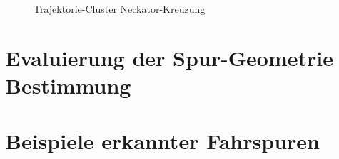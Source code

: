 \begin{figure}[H]
    \centering
    \qquad \qquad
    \caption{Trajektorie-Cluster Neckator-Kreuzung}
    \label{fig:results_clusters_neckartor_filtered}
\end{figure}

\section{Evaluierung der Spur-Geometrie Bestimmung}

\section{Beispiele erkannter Fahrspuren}
